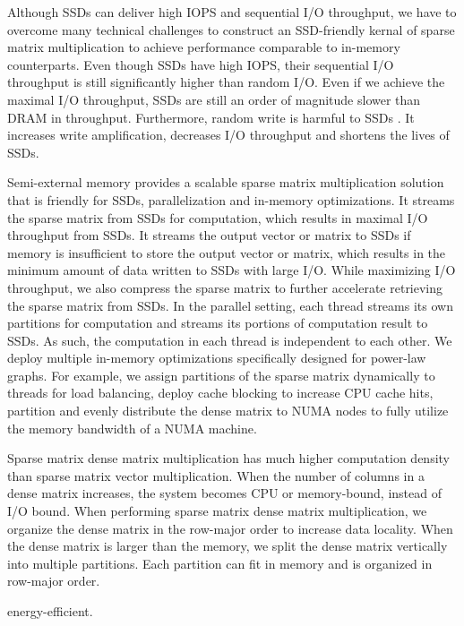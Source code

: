 
Although SSDs can deliver high IOPS and sequential I/O throughput, we have
to overcome many technical challenges to construct an SSD-friendly kernal
of sparse matrix multiplication to achieve performance comparable to in-memory
counterparts. Even though SSDs have high IOPS, their sequential I/O throughput
is still significantly higher than random I/O. Even if we achieve
the maximal I/O throughput, SSDs are still an order of magnitude slower
than DRAM in throughput. Furthermore, random write is harmful to SSDs
\cite{sfs}. It increases write amplification, decreases I/O throughput
and shortens the lives of SSDs.

Semi-external memory provides a scalable sparse matrix multiplication solution
that is friendly for SSDs, parallelization and in-memory optimizations.
It streams the sparse matrix from SSDs for computation, which results in maximal
I/O throughput from SSDs. It streams the output vector or matrix to SSDs if
memory is insufficient to store the output vector or matrix, which results in
the minimum amount of data written to SSDs with large I/O. While maximizing I/O
throughput, we also compress
the sparse matrix to further accelerate retrieving the sparse matrix from SSDs.
In the parallel setting, each thread streams its own partitions for computation
and streams its portions of computation result to SSDs. As such, the computation
in each thread is independent to each other.
We deploy multiple in-memory optimizations specifically designed for power-law
graphs. For example, we assign partitions of the sparse matrix dynamically to
threads for load balancing, deploy cache blocking to increase CPU cache hits,
partition and evenly distribute the dense matrix to NUMA nodes to fully utilize
the memory bandwidth of a NUMA machine.

Sparse matrix dense matrix multiplication has much higher computation density
than sparse matrix vector multiplication. When the number of columns in
a dense matrix increases, the system becomes CPU or memory-bound, instead of
I/O bound.
When performing sparse matrix dense matrix multiplication, we organize
the dense matrix in the row-major order to increase data locality.
When the dense matrix is larger than the memory, we split the dense matrix
vertically into multiple partitions. Each partition can fit in memory and
is organized in row-major order.


energy-efficient.

